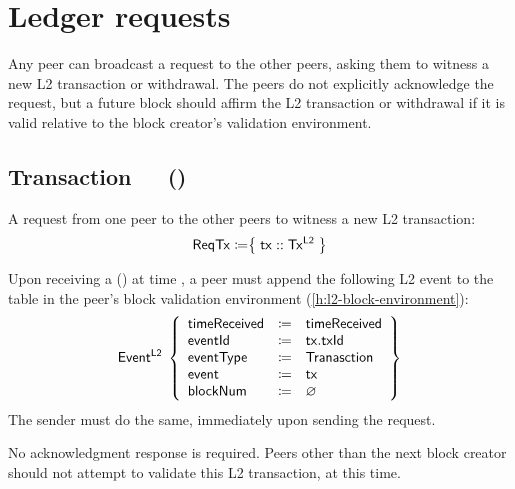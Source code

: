 \documentclass[../hydrozoa.tex]{subfiles}
\begin{document}


\section{Ledger requests}%
\label{h:l2-consensus-ledger}%

Any peer can broadcast a request to the other peers, asking them to witness a new L2 transaction or withdrawal.
The peers do not explicitly acknowledge the request, but a future block should affirm the L2 transaction or withdrawal if it is valid relative to the block creator's validation environment.

\subsection{Transaction~~~()}%
\label{h:l2-consensus-transaction}%

A request from one peer to the other peers to witness a new L2 transaction:
\begin{equation*}
  \mathsf{ReqTx} \coloneq \bigr\{\; \mathsf{tx} :: \mathsf{Tx^{L2}} \;\bigr\}
\end{equation*}

Upon receiving a () at time , a peer must append the following L2 event to the  table in the peer's block validation environment (\cref{h:l2-block-environment}):
\begin{equation*}
  \mathsf{Event^{L2}}\;\left\{
  \begin{array}{lll}
    \mathsf{timeReceived} &\coloneq& \mathsf{timeReceived} \\
    \mathsf{eventId} &\coloneq& \mathsf{tx.txId} \\
    \mathsf{eventType} &\coloneq& \mathsf{Tranasction} \\
    \mathsf{event} &\coloneq& \mathsf{tx} \\
    \mathsf{blockNum} &\coloneq& \varnothing
  \end{array}\right\}
\end{equation*}
The sender must do the same, immediately upon sending the request.

No acknowledgment response is required.
Peers other than the next block creator should not attempt to validate this L2 transaction, at this time.
\end{document}
